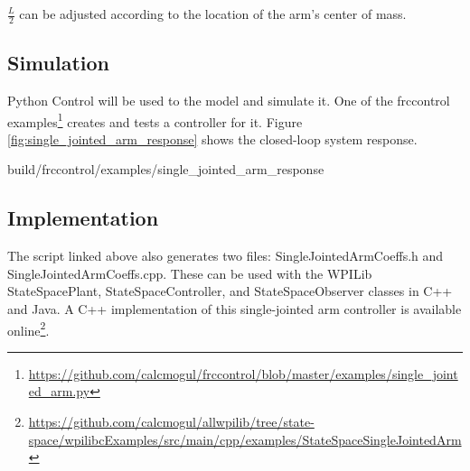 $\frac{L}{2}$ can be adjusted according to the location of the arm's center of
mass.

\subsection{Simulation}

Python Control will be used to  the
\gls{model} and simulate it. One of the frccontrol
examples\footnote{\url{https://github.com/calcmogul/frccontrol/blob/master/examples/single_jointed_arm.py}}
creates and tests a controller for it. Figure
\ref{fig:single_jointed_arm_response} shows the closed-loop \gls{system}
response.

\begin{svg}{build/frccontrol/examples/single_jointed_arm_response}
  \caption{Single-jointed arm response}
  \label{fig:single_jointed_arm_response}
\end{svg}

\subsection{Implementation}

The script linked above also generates two files: SingleJointedArmCoeffs.h and
SingleJointedArmCoeffs.cpp. These can be used with the WPILib StateSpacePlant,
StateSpaceController, and StateSpaceObserver classes in C++ and Java. A C++
implementation of this single-jointed arm controller is available
online\footnote{\url{https://github.com/calcmogul/allwpilib/tree/state-space/wpilibcExamples/src/main/cpp/examples/StateSpaceSingleJointedArm}}.
